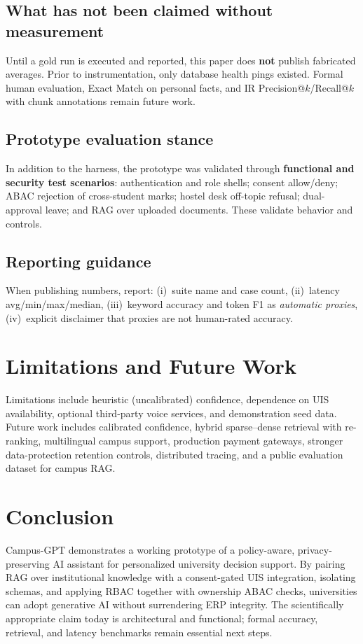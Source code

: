 \documentclass[conference]{IEEEtran}
\begin{document}
\subsection{What has not been claimed without measurement}
Until a gold run is executed and reported, this paper does \textbf{not} publish fabricated averages. Prior to instrumentation, only database health pings existed. Formal human evaluation, Exact Match on personal facts, and IR Precision@$k$/Recall@$k$ with chunk annotations remain future work.

\subsection{Prototype evaluation stance}
In addition to the harness, the prototype was validated through \textbf{functional and security test scenarios}: authentication and role shells; consent allow/deny; ABAC rejection of cross-student marks; hostel desk off-topic refusal; dual-approval leave; and RAG over uploaded documents. These validate behavior and controls.

\subsection{Reporting guidance}
When publishing numbers, report: (i)~suite name and case count, (ii)~latency avg/min/max/median, (iii)~keyword accuracy and token F1 as \emph{automatic proxies}, (iv)~explicit disclaimer that proxies are not human-rated accuracy.

\section{Limitations and Future Work}
Limitations include heuristic (uncalibrated) confidence, dependence on UIS availability, optional third-party voice services, and demonstration seed data. Future work includes calibrated confidence, hybrid sparse--dense retrieval with re-ranking, multilingual campus support, production payment gateways, stronger data-protection retention controls, distributed tracing, and a public evaluation dataset for campus RAG.

\section{Conclusion}
Campus-GPT demonstrates a working prototype of a policy-aware, privacy-preserving AI assistant for personalized university decision support. By pairing RAG over institutional knowledge with a consent-gated UIS integration, isolating schemas, and applying RBAC together with ownership ABAC checks, universities can adopt generative AI without surrendering ERP integrity. The scientifically appropriate claim today is architectural and functional; formal accuracy, retrieval, and latency benchmarks remain essential next steps.
\end{document}

